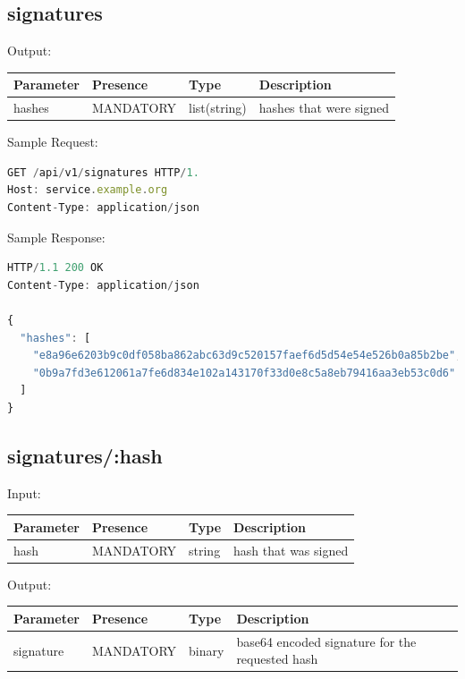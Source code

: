 \subsection{signatures}
Output:

\begin{tabular}{|l|l|l|l|}
	\hline
	Parameter & Presence & Type & Description \\ \hline
	hashes & MANDATORY & list(string) & hashes that were signed \\ \hline
\end{tabular}

Sample Request:

\begin{lstlisting}[caption={signatures request}, captionpos=b, language=JavaScript, label={lst:signaturesrequest}]
GET /api/v1/signatures HTTP/1.
Host: service.example.org
Content-Type: application/json
\end{lstlisting}

Sample Response:

\begin{lstlisting}[caption={signatures response}, captionpos=b, language=JavaScript, label={lst:signaturesresponse}]
HTTP/1.1 200 OK
Content-Type: application/json

{
  "hashes": [
    "e8a96e6203b9c0df058ba862abc63d9c520157faef6d5d54e54e526b0a85b2be",
    "0b9a7fd3e612061a7fe6d834e102a143170f33d0e8c5a8eb79416aa3eb53c0d6"
  ]
}
\end{lstlisting}

\subsection{signatures/:hash}
Input:

\begin{tabular}{|l|l|l|l|}
	\hline
	Parameter & Presence & Type & Description \\ \hline
	hash & MANDATORY & string & hash that was signed \\ \hline
\end{tabular}

Output:

\begin{tabular}{|l|l|l|l|}
	\hline
	Parameter & Presence & Type & Description \\ \hline
	signature & MANDATORY & binary & base64 encoded signature for the requested hash \\ \hline
\end{tabular}

